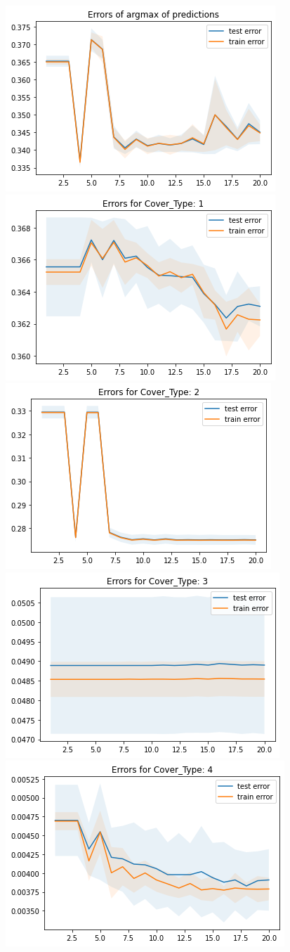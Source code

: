 \documentclass{scrartcl}
\begin{document}
\begin{figure}
\centering
{\includegraphics[width=.45\textwidth]{imgs/N100000_T20/full_plot_big.png}} \quad
{\includegraphics[width=.45\textwidth]{imgs/N100000_T20/cv_1_big.png}} \\
{\includegraphics[width=.45\textwidth]{imgs/N100000_T20/cv_2_big.png}} \quad
{\includegraphics[width=.45\textwidth]{imgs/N100000_T20/cv_3_big.png}} \\
{\includegraphics[width=.45\textwidth]{imgs/N100000_T20/cv_4_big.png}} \quad

\end{figure}
\end{document}
